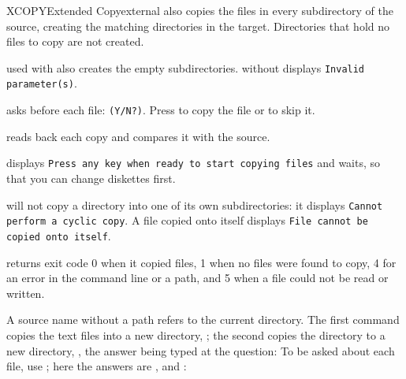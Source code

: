 \begin{DosEntry}{XCOPY}{Extended Copy}{external}
 also copies the files in every subdirectory of the source,
creating the matching directories in the target.  Directories that hold no
files to copy are not created.

 used with  also creates the empty subdirectories.
 without  displays \texttt{Invalid parameter(s)}.

 asks before each file:
 \texttt{(Y/N?)}.  Press  to copy the file or 
to skip it.

 reads back each copy and compares it with the source.

 displays \texttt{Press any key when ready to start copying
files} and waits, so that you can change diskettes first.

 will not copy a directory into one of its own subdirectories:
it displays \texttt{Cannot perform a cyclic copy}.  A file copied onto
itself displays \texttt{File cannot be copied onto itself}.

 returns exit code 0 when it copied files, 1 when no files were
found to copy, 4 for an error in the command line or a path, and 5 when a
file could not be read or written.

A source name without a path refers to the current directory.
\Example
The first command copies the text files into a new directory,
; the second copies the directory  to a new
directory, , the answer  being typed at the question:
To be asked about each file, use ; here the answers are ,
 and :
\end{DosEntry}
